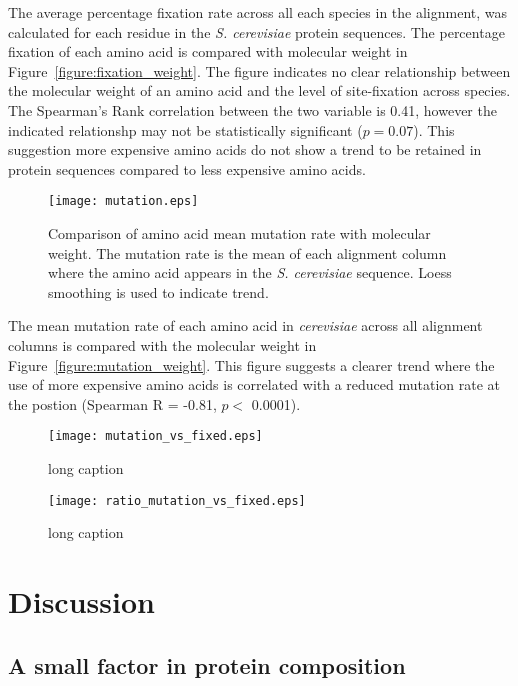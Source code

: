 The average percentage fixation rate across all each species in the alignment, was calculated for each residue in the \emph{S. cerevisiae} protein sequences. The percentage fixation of each amino acid is compared with molecular weight in Figure~\vref{figure:fixation_weight}. The figure indicates no clear relationship between the molecular weight of an amino acid and the level of site-fixation across species. The Spearman's Rank correlation between the two variable is 0.41, however the indicated relationshp may not be statistically significant ($p = 0.07$). This suggestion more expensive amino acids do not show a trend to be retained in protein sequences compared to less expensive amino acids.

\begin{figure}
  \centering
  \texttt{[image: mutation.eps]}
  \caption[Comparison of amino acid mean mutation rate with molecular weight]{Comparison of amino acid mean mutation rate with molecular weight. The mutation rate is the mean of each alignment column where the amino acid appears in the \emph{S. cerevisiae} sequence. Loess smoothing is used to indicate trend.}
  \label{figure:mutation_weight}
\end{figure}

The mean mutation rate of each amino acid in \emph{cerevisiae} across all alignment columns is compared with the molecular weight in Figure~\vref{figure:mutation_weight}. This figure suggests a clearer trend where the use of more expensive amino acids is correlated with a reduced mutation rate at the postion (Spearman R = -0.81, $p <$ 0.0001).

\begin{figure}
  \centering
  \texttt{[image: mutation\_vs\_fixed.eps]}
  \caption[short caption]{long caption}
  \label{figure:mutation_vs_fixed}
\end{figure}

\begin{figure}
  \centering
  \texttt{[image: ratio\_mutation\_vs\_fixed.eps]}
  \caption[short caption]{long caption}
  \label{figure:ratio_mutation_vs_fixed}
\end{figure}

\clearpage

\section{Discussion}

\subsection{A small factor in protein composition}

